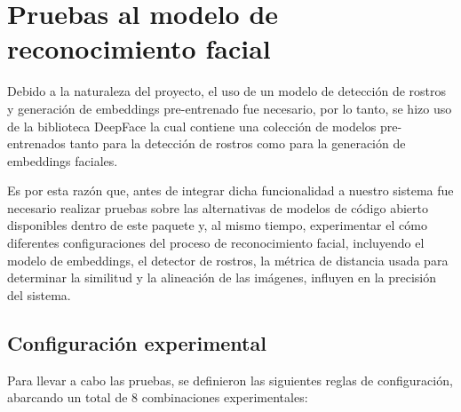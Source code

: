 \section{Pruebas al modelo de reconocimiento facial}

Debido a la naturaleza del proyecto, el uso de un modelo de detección de rostros y generación de embeddings pre-entrenado fue necesario, por lo tanto, se hizo uso de la biblioteca DeepFace la cual contiene una colección de modelos pre-entrenados tanto para la detección de rostros como para la generación de embeddings faciales.

Es por esta razón que, antes de integrar dicha funcionalidad a nuestro sistema fue necesario realizar pruebas sobre las alternativas de modelos de código abierto disponibles dentro de este paquete y, al mismo tiempo, experimentar el cómo diferentes configuraciones del proceso de reconocimiento facial, incluyendo el modelo de embeddings, el detector de rostros, la métrica de distancia usada para determinar la similitud y la alineación de las imágenes, influyen en la precisión del sistema.


\subsection{Configuración experimental}

Para llevar a cabo las pruebas, se definieron las siguientes reglas de configuración, abarcando un total de 8 combinaciones experimentales:


